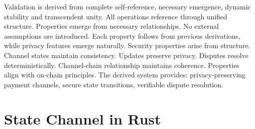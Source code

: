 \documentclass[11pt]{amsart}
\begin{document}
Validation is derived from complete self-reference, necessary emergence, dynamic stability and transcendent unity. All operations reference through unified structure. Properties emerge from necessary relationships. No external assumptions are introduced. Each property follows from previous derivations, while privacy features emerge naturally. Security properties arise from structure. Channel states maintain consistency. Updates preserve privacy. Disputes resolve deterministically. Channel-chain relationship maintains coherence. Properties align with on-chain principles. The derived system provides: privacy-preserving payment channels, secure state transitions, verifiable dispute resolution.

\appendix
\section{State Channel in Rust}
\end{document}

